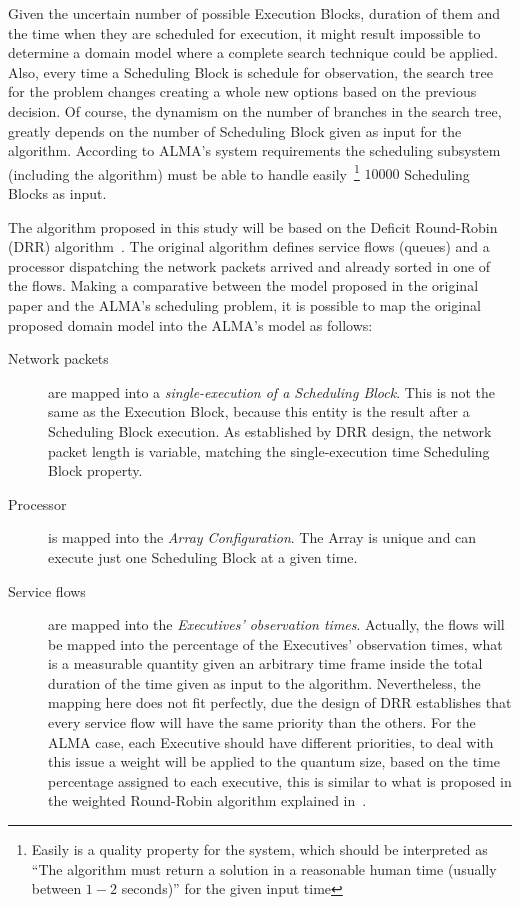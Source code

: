 Given the uncertain number of possible Execution Blocks, duration of them and the time when they are scheduled for execution, it might result impossible to determine a domain model where a complete search technique could be applied. Also, every time a Scheduling Block is schedule for observation, the search tree for the problem changes creating a whole new options based on the previous decision. Of course, the dynamism on the number of branches in the search tree, greatly depends on the number of Scheduling Block given as input for the algorithm. According to ALMA's system requirements the scheduling subsystem (including the algorithm) must be able to handle easily~\footnote{Easily is a quality property for the system, which should be interpreted as ``The algorithm must return a solution in a reasonable human time (usually between $1-2$ seconds)'' for the given input time} $10000$ Scheduling Blocks as input.

The algorithm proposed in this study will be based on the Deficit Round-Robin (DRR) algorithm~\cite{shreedhar96}. The original algorithm defines service flows (queues) and a processor dispatching the network packets arrived and already sorted in one of the flows. Making a comparative between the model proposed in the original paper and the ALMA's scheduling problem, it is possible to map the original proposed domain model into the ALMA's model as follows:

\begin{description}
\item[Network packets] are mapped into a \textit{single-execution of a Scheduling Block}. This is not the same as the Execution Block, because this entity is the result after a Scheduling Block execution. As established by DRR design, the network packet length is variable, matching the single-execution time Scheduling Block property.

\item[Processor] is mapped into the \textit{Array Configuration}. The Array is unique and can execute just one Scheduling Block at a given time.

\item[Service flows] are mapped into the \textit{Executives' observation times}. Actually, the flows will be mapped into the percentage of the Executives' observation times, what is a measurable quantity given an arbitrary time frame inside the total duration of the time given as input to the algorithm. Nevertheless, the mapping here does not fit perfectly, due the design of DRR establishes that every service flow will have the same priority than the others. For the ALMA case, each Executive should have different priorities, to deal with this issue a weight will be applied to the quantum size, based on the time percentage assigned to each executive, this is similar to what is proposed in the weighted Round-Robin algorithm explained in~\cite{katevenis91}.
\end{description}


